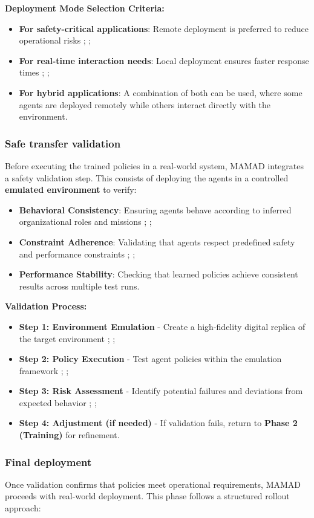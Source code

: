 \documentclass[pdflatex,sn-mathphys-num]{sn-jnl}%
\theoremstyle{thmstyleone}%
\theoremstyle{thmstyletwo}%
\theoremstyle{thmstylethree}%
\begin{document}
\noindent \textbf{Deployment Mode Selection Criteria:}
\begin{itemize}
    \item \textbf{For safety-critical applications}: Remote deployment is preferred to reduce operational risks ; ;
    \item \textbf{For real-time interaction needs}: Local deployment ensures faster response times ; ;
    \item \textbf{For hybrid applications}: A combination of both can be used, where some agents are deployed remotely while others interact directly with the environment.
\end{itemize}

\subsubsection{Safe transfer validation}
Before executing the trained policies in a real-world system, MAMAD integrates a safety validation step. This consists of deploying the agents in a controlled \textbf{emulated environment} to verify:
\begin{itemize}
    \item \textbf{Behavioral Consistency}: Ensuring agents behave according to inferred organizational roles and missions ; ;
    \item \textbf{Constraint Adherence}: Validating that agents respect predefined safety and performance constraints ; ;
    \item \textbf{Performance Stability}: Checking that learned policies achieve consistent results across multiple test runs.
\end{itemize}

\noindent \textbf{Validation Process:}
\begin{itemize}
    \item \textbf{Step 1: Environment Emulation} - Create a high-fidelity digital replica of the target environment ; ;
    \item \textbf{Step 2: Policy Execution} - Test agent policies within the emulation framework ; ;
    \item \textbf{Step 3: Risk Assessment} - Identify potential failures and deviations from expected behavior ; ;
    \item \textbf{Step 4: Adjustment (if needed)} - If validation fails, return to \textbf{Phase 2 (Training)} for refinement.
\end{itemize}

\subsubsection{Final deployment}
Once validation confirms that policies meet operational requirements, MAMAD proceeds with real-world deployment. This phase follows a structured rollout approach:
\end{document}

